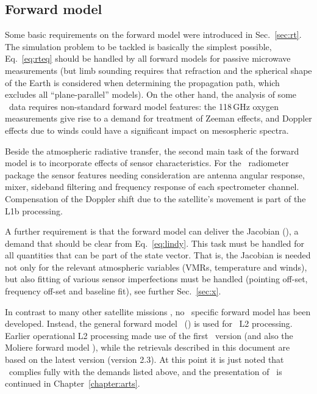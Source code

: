 \subsection{Forward model}
\label{sec:setup:forward}
%
Some basic requirements on the forward model were introduced in
Sec.~\ref{sec:rt}. The simulation problem to be tackled is basically the
simplest possible, Eq.~\ref{eq:rteq} should be handled by all forward models
for passive microwave measurements (but limb sounding requires that refraction
and the spherical shape of the Earth is considered when determining the
propagation path, which excludes all ``plane-parallel'' models). On the other
hand, the analysis of some \smr\ data requires non-standard forward model
features: the 118\,GHz oxygen measurements give rise to a demand for treatment
of Zeeman effects, and Doppler effects due to winds could have a significant
impact on mesospheric spectra.

Beside the atmospheric radiative transfer, the second main task of the forward
model is to incorporate effects of sensor characteristics. For the \smr\
radiometer package the sensor features needing consideration are antenna
angular response, mixer, sideband filtering and frequency response of each
spectrometer channel. Compensation of the Doppler shift due to
the satellite's movement is part of the L1b processing.

A further requirement is that the forward model can deliver the Jacobian
(\aWfnMtr{\SttVct}), a demand that should be clear from Eq.~\ref{eq:lindy}.
This task must be handled for all quantities that can be part of the state
vector. That is, the Jacobian is needed not only for the relevant atmospheric
variables (VMRs, temperature and winds), but also fitting of various sensor
imperfections must be handled (pointing off-set, frequency off-set and baseline
fit), see further Sec.~\ref{sec:x}.

In contrast to many other satellite missions \citep[e.g.][]{read2006clear}, no
\smr\ specific forward model has been developed. Instead, the general forward
model \ARTS\ (\ARTSlong) is used for \smr\ L2 processing. Earlier operational
L2 processing \citep{urban:odins:05-b} made use of the first \ARTS\ version
(and also the Moliere forward model \citep{urban2004moliere}), while the
retrievals described in this document are based on the latest version (version
2.3). At this point it is just noted that \ARTS\ complies fully with the
demands listed above, and the presentation of \ARTS\ is continued in
Chapter~\ref{chapter:arts}.



